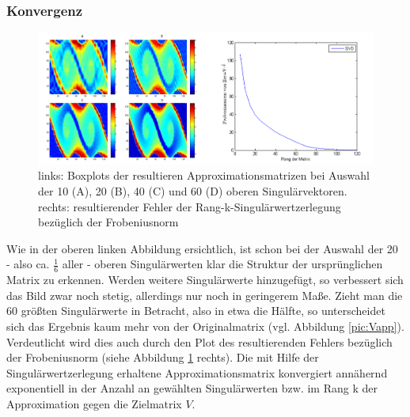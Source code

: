 \documentclass[12pt,a4paper,twoside]{article}
\begin{document}
\subsubsection*{Konvergenz}
\begin{figure}[h]
	
	\centering
	\includegraphics[scale=0.45]{SVD_plots_graph}
	\caption{\label{pic:SVD_plots}links: Boxplots der resultieren Approximationsmatrizen bei Auswahl der 10 (A), 20 (B), 40 (C) und 60 (D) oberen Singulärvektoren. rechts: resultierender Fehler der Rang-k-Singulärwertzerlegung bezüglich der Frobeniusnorm}
\end{figure}
Wie in der oberen linken Abbildung ersichtlich, ist schon bei der Auswahl der 20 - also ca. $\frac{1}{6}$ aller - oberen Singulärwerten klar die Struktur der ursprünglichen Matrix zu erkennen. Werden weitere Singulärwerte hinzugefügt, so verbessert sich das Bild zwar noch stetig, allerdings nur noch in geringerem Maße. Zieht man die 60 größten Singulärwerte in Betracht, also in etwa die Hälfte, so unterscheidet sich das Ergebnis kaum mehr von der Originalmatrix (vgl. Abbildung \ref{pic:Vapp}). \newline
\newline
Verdeutlicht wird dies auch durch den Plot des resultierenden Fehlers bezüglich der Frobeniusnorm (siehe Abbildung \ref{pic:SVD_plots} rechts). Die mit Hilfe der Singulärwertzerlegung erhaltene Approximationsmatrix konvergiert annähernd exponentiell in der Anzahl an gewählten Singulärwerten bzw. im Rang k der Approximation gegen die Zielmatrix $V$.
\end{document}
